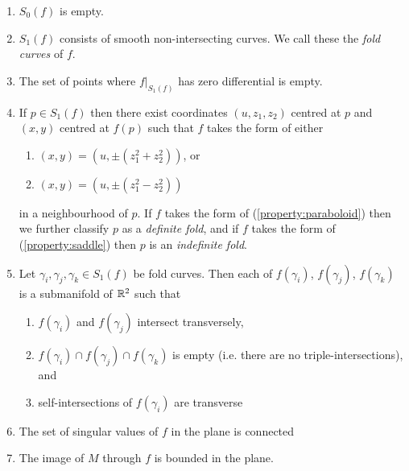 \begin{enumerate}
	\item $S_0(f)$ is empty.
	
	\item $S_1(f)$ consists of smooth non-intersecting curves.  We call these the \emph{fold curves} of $f$.
	
	\item The set of points where $f|_{S_1(f)}$ has zero differential is empty.
	
	\item\label{strat-con:fold-type} If $p\in S_1(f)$ then there exist coordinates $(u, z_1, z_2)$ centred at $p$ and $(x,y)$ centred at $f(p)$ such that $f$ takes the form of either
	\begin{enumerate}
		\item\label{property:paraboloid} $(x,y)=(u,\pm(z_1^2+z_2^2))$, or
		\item\label{property:saddle} $(x,y)=(u,\pm(z_1^2-z_2^2))$
	\end{enumerate}
	in a neighbourhood of $p$.
	If $f$ takes the form of (\ref{property:paraboloid}) then we further classify $p$ as a \emph{definite fold}, and if $f$ takes the form of (\ref{property:saddle}) then $p$ is an \emph{indefinite fold}.
	
	\item Let $\gamma_i, \gamma_j, \gamma_k \in S_1(f)$ be fold curves. Then each of $f(\gamma_i)$, $f(\gamma_j)$, $f(\gamma_k)$ is a submanifold of $\mathbb{R}^2$ such that
	\begin{enumerate}
		\item $f(\gamma_i)$ and $f(\gamma_j)$ intersect transversely,
		
		\item $f(\gamma_i)\cap f(\gamma_j)\cap f(\gamma_k)$ is empty (i.e. there are no triple-intersections), and
		
		\item self-intersections of $f(\gamma_i)$ are transverse
	\end{enumerate}
	
	\item The set of singular values of $f$ in the plane is connected
	
	\item The image of $M$ through $f$ is bounded in the plane.
	
\end{enumerate}

